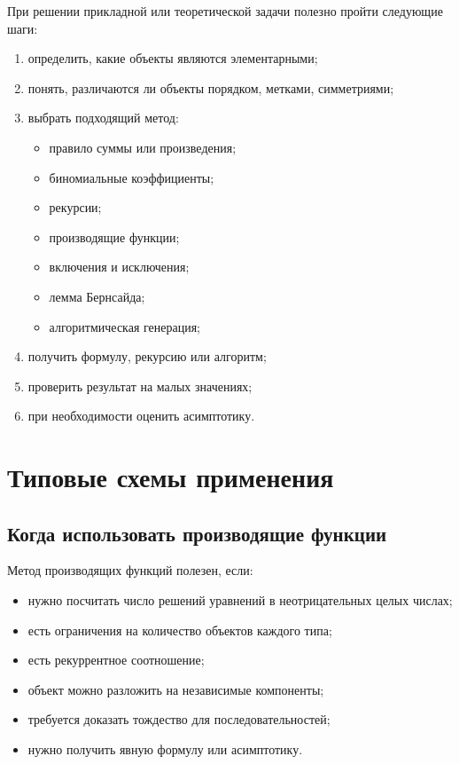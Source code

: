 \documentclass[12pt,a4paper]{article}
\begin{document}
При решении прикладной или теоретической задачи полезно пройти следующие шаги:
\begin{enumerate}
    \item определить, какие объекты являются элементарными;
    \item понять, различаются ли объекты порядком, метками, симметриями;
    \item выбрать подходящий метод:
    \begin{itemize}
        \item правило суммы или произведения;
        \item биномиальные коэффициенты;
        \item рекурсии;
        \item производящие функции;
        \item включения и исключения;
        \item лемма Бернсайда;
        \item алгоритмическая генерация;
    \end{itemize}
    \item получить формулу, рекурсию или алгоритм;
    \item проверить результат на малых значениях;
    \item при необходимости оценить асимптотику.
\end{enumerate}

\section{Типовые схемы применения}

\subsection{Когда использовать производящие функции}

Метод производящих функций полезен, если:
\begin{itemize}
    \item нужно посчитать число решений уравнений в неотрицательных целых числах;
    \item есть ограничения на количество объектов каждого типа;
    \item есть рекуррентное соотношение;
    \item объект можно разложить на независимые компоненты;
    \item требуется доказать тождество для последовательностей;
    \item нужно получить явную формулу или асимптотику.
\end{itemize}
\end{document}
